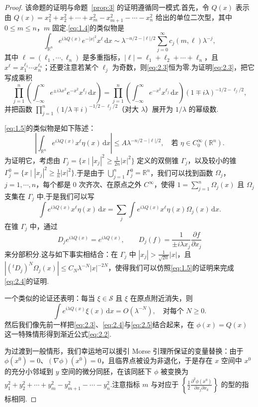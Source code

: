 \documentclass[
  BookTitleCN={傅里叶分析中的振动积分},
  BookTitleEN={Oscillatory Integrals in Fourier Analysis},
  OriginalAuthor={E.~M. Stein},
  OriginalEdition={Proc. Sympos. Pure Math. 35, Part~1},
  OriginalPublisher={American Mathematical Society},
  OriginalYear={1979},
  Translator={翻译及重排},
  ModelUsed={Codex CLI},
  Biblatex=false,
  TranslationDate={2026年8月27日}
]{mathtranslation}
\numberwithin{equation}{chapter}   %
\newcommand{\R}{\mathbb{R}}
\begin{document}
\begin{proof}
  该命题的证明与命题~\ref{prop:3} 的证明遵循同一模式.首先，令 $Q(x)$ 表示由 $Q(x)=x_1^{2}+x_2^{2}+\cdots+x_m^{2}-x_{m+1}^{2}-\cdots-x_n^{2}$ 给出的单位二次型，其中 $0\leq m\leq n$，$m$ 固定.\eqref{eq:1.4}的类似物是
  \begin{equation}
    \int_{\R^n}e^{i\lambda Q(x)}e^{-|x|^{2}}x^{\ell}\,\mathrm{d}x \sim \lambda^{-n/2-|\ell|/2}\sum_{j=0}^{\infty}c_{j}(m,\ell)\lambda^{-j}, \label{eq:2.3}
  \end{equation}
  其中 $\ell=(\ell_1,\cdots,\ell_n)$ 是多重指标，$|\ell|=\ell_1+\ell_2+\cdots+\ell_n$，且 $x^{\ell}=x_1^{\ell_1}\cdots x_n^{\ell_n}$；还要注意若某个 $\ell_j$ 为奇数，则\eqref{eq:2.3}恒为零.为证明\eqref{eq:2.3}，把它写成乘积
  \[
    \prod_{j=1}^{n}\left(\int_{-\infty}^{\infty}e^{\pm i\lambda x^{2}}e^{-x^{2}}x^{\ell_j}\,\mathrm{d}x\right) = \prod_{j=1}^{n}\left(\int_{-\infty}^{\infty}e^{-x^{2}}x^{\ell_j}\,\mathrm{d}x\right)(1\mp i\lambda)^{-1/2-\ell_j/2},
  \]
  并把函数 $\prod_{j=1}^{n}(1/\lambda\mp i)^{-1/2-\ell_j/2}$（对大 $\lambda$）展开为 $1/\lambda$ 的幂级数.

  \eqref{eq:1.5}的类似物是如下陈述：
  \begin{equation}
    \left|\int_{\R^n}e^{i\lambda Q(x)}x^{\ell}\eta(x)\,\mathrm{d}x\right|\leq A\lambda^{-n/2-|\ell|/2},\quad\text{若 }\eta\in C_0^\infty(\R^n). \label{eq:2.4}
  \end{equation}
  为证明它，考虑由 $\Gamma_j=\{x\mid |x_j|^{2}\geq\frac{1}{2n}|x|^{2}\}$ 定义的双侧锥 $\Gamma_j$，以及较小的锥 $\Gamma_j^{0}=\{x\mid |x_j|^{2}\geq\frac{1}{n}|x|^{2}\}$.于是由于 $\bigcup_{j=1}^{n}\Gamma_j^{0}=\R^n$，我们可以找到函数 $\Omega_j$，$j=1,\cdots,n$，每个都是 $0$ 次齐次、在原点之外 $C^\infty$，使得 $1=\sum_{j=1}^{n}\Omega_{j}(x)$ 且 $\Omega_{j}$ 支集在 $\Gamma_j$ 中.于是我们可以写
  \[
    \int e^{i\lambda Q(x)}x^{\ell}\eta(x)\,\mathrm{d}x = \sum_{j}\int e^{i\lambda Q(x)}x^{\ell}\eta(x)\Omega_{j}(x)\,\mathrm{d}x .
  \]
  在锥 $\Gamma_j$ 中，通过
  \[
    D_{j}e^{i\lambda Q(x)}=e^{i\lambda Q(x)},\qquad D_{j}(f)=\frac{1}{\pm i\lambda x_j}\frac{\partial f}{\partial x_j}
  \]
  来分部积分.这与如下事实相结合：在 $\Gamma_j$ 中 $|x_j|>\frac{1}{\sqrt{2n}}|x|$，且 $|({}^{t}D_{j})^{N}\Omega_{j}(x)|\leq C_{N}\lambda^{-N}|x|^{-2N}$，使得我们可以仿照\eqref{eq:1.5}的证明来完成\eqref{eq:2.4}的证明.

  一个类似的论证还表明：每当 $\xi\in\mathscr{S}$ 且 $\xi$ 在原点附近消失，则
  \begin{equation}
    \int e^{i\lambda Q(x)}\xi(x)\,\mathrm{d}x = O(\lambda^{-N}),\quad\text{对每个 }N\geq0 . \label{eq:2.5}
  \end{equation}
  然后我们像先前一样把\eqref{eq:2.3}、\eqref{eq:2.4}与\eqref{eq:2.5}结合起来，在 $\phi(x)=Q(x)$ 这一特殊情形得到渐近公式\eqref{eq:2.2}.

  为过渡到一般情形，我们幸运地可以援引 Morse 引理所保证的变量替换：由于 $\phi(x^{0})=0$、$(\nabla\phi)(x^{0})=0$，且临界点被设为非退化，于是存在 $x$ 空间中 $x^{0}$ 的充分小邻域到 $y$ 空间的微分同胚，在该同胚下 $\phi$ 被变换为 $y_1^{2}+y_2^{2}+\cdots+y_m^{2}-y_{m+1}^{2}-\cdots-y_n^{2}$.注意指标 $m$ 与对应于 $\left\{\frac{1}{2}\frac{\partial^{2}\phi(x^{0})}{\partial x_j\partial x_k}\right\}$ 的型的指标相同.
\end{proof}
\end{document}
